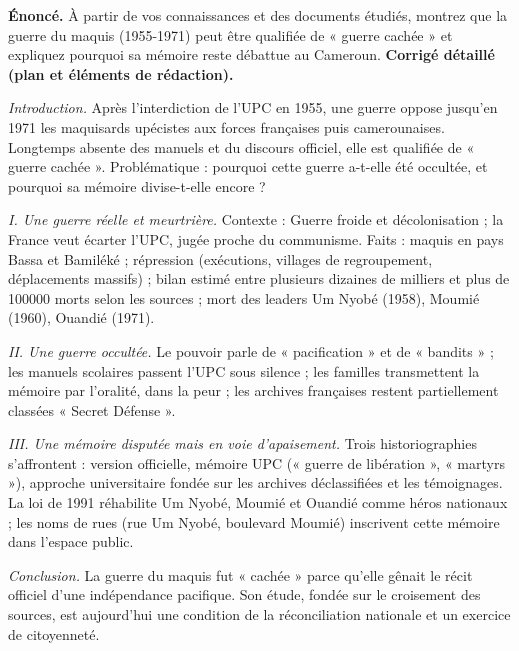 \documentclass[11pt]{article}
\begin{document}
\begin{exoresolu}
\textbf{Énoncé.} À partir de vos connaissances et des documents étudiés, montrez que la guerre du maquis (1955-1971) peut être qualifiée de « guerre cachée » et expliquez pourquoi sa mémoire reste débattue au Cameroun.
\tcblower
\textbf{Corrigé détaillé (plan et éléments de rédaction).}

\emph{Introduction.} Après l'interdiction de l'UPC en 1955, une guerre oppose jusqu'en 1971 les maquisards upécistes aux forces françaises puis camerounaises. Longtemps absente des manuels et du discours officiel, elle est qualifiée de « guerre cachée ». Problématique : pourquoi cette guerre a-t-elle été occultée, et pourquoi sa mémoire divise-t-elle encore ?

\emph{I. Une guerre réelle et meurtrière.} Contexte : Guerre froide et décolonisation ; la France veut écarter l'UPC, jugée proche du communisme. Faits : maquis en pays Bassa et Bamiléké ; répression (exécutions, villages de regroupement, déplacements massifs) ; bilan estimé entre plusieurs dizaines de milliers et plus de \num{100000} morts selon les sources ; mort des leaders Um Nyobé (1958), Moumié (1960), Ouandié (1971).

\emph{II. Une guerre occultée.} Le pouvoir parle de « pacification » et de « bandits » ; les manuels scolaires passent l'UPC sous silence ; les familles transmettent la mémoire par l'oralité, dans la peur ; les archives françaises restent partiellement classées « Secret Défense ».

\emph{III. Une mémoire disputée mais en voie d'apaisement.} Trois historiographies s'affrontent : version officielle, mémoire UPC (« guerre de libération », « martyrs »), approche universitaire fondée sur les archives déclassifiées et les témoignages. La loi de 1991 réhabilite Um Nyobé, Moumié et Ouandié comme héros nationaux ; les noms de rues (rue Um Nyobé, boulevard Moumié) inscrivent cette mémoire dans l'espace public.

\emph{Conclusion.} La guerre du maquis fut « cachée » parce qu'elle gênait le récit officiel d'une indépendance pacifique. Son étude, fondée sur le croisement des sources, est aujourd'hui une condition de la réconciliation nationale et un exercice de citoyenneté.
\end{exoresolu}
\end{document}
